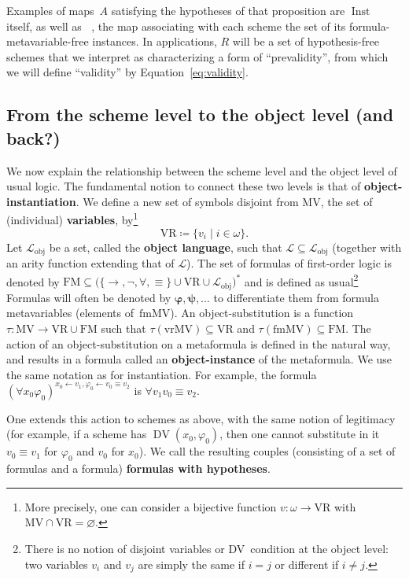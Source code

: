 \documentclass[11pt]{article}
\newcommand*{\define}[1]{\textbf{#1}}%
\renewcommand*{\phi}{\varphi}
\newcommand*{\calL}{\mathcal{L}}
\newcommand*{\VR}{\mathrm{VR}}
\newcommand*{\vrMV}{\mathrm{vrMV}}
\newcommand*{\fmMV}{\mathrm{fmMV}}
\newcommand*{\MV}{\mathrm{MV}}
\newcommand*{\FM}{\mathrm{FM}}
\DeclareMathOperator{\DV}{DV}
\DeclareMathOperator{\Inst}{Inst}
\DeclareMathOperator{\InstfmMVfree}{{\Inst_{\fmMV\text{-}\mathrm{free}}}}
\theoremstyle{plain}
\theoremstyle{definition}
\theoremstyle{remark}
\begin{document}
Examples of maps~$A$ satisfying the hypotheses of that proposition are $\Inst$ itself, as well
as $\InstfmMVfree$, the map associating with each scheme the set of its formula-metavariable-free
instances.
In applications, $R$ will be a set of hypothesis-free schemes that we interpret as characterizing
a form of ``prevalidity'', from which we will define ``validity'' by Equation~\eqref{eq:validity}.




\subsection{From the scheme level to the object level (and back?)}

We now explain the relationship between the scheme level and the object level of usual logic. The
fundamental notion to connect these two levels is that of \define{object-instantiation}. We 
define a new set of symbols disjoint from $\MV$, the set of (individual) \define{variables},
by\footnote{
More precisely, one can consider a bijective function $v \colon \omega \to \VR$ with
$\MV \cap \VR = \varnothing$.}
\begin{equation}
\VR \coloneqq \{v_i \mid i \in \omega \}.
\end{equation}
Let $\calL_\text{obj}$ be a set, called the \define{object language}, such that
$\calL \subseteq \calL_\text{obj}$ (together with an arity function extending that of $\calL$).
The set of formulas of first-order logic is denoted by
$\FM \subseteq \bigl( \{ \to , \neg, \forall, \equiv \} \cup \VR \cup \calL_\text{obj} \bigr)^*$
and is defined as usual\footnote{
There is no notion of disjoint variables or DV~condition at the object level: two variables $v_i$
and $v_j$ are simply the same if $i = j$ or different if $i\neq j$.}
Formulas will often be denoted by $\bm\phi, \bm\psi, \dots$ to differentiate them from formula
metavariables (elements of~$\fmMV$).
An object-substitution is a function $\tau \colon \MV \to \VR \cup \FM$ such that
$\tau(\vrMV) \subseteq \VR$ and $\tau(\fmMV) \subseteq \FM$.
The action of an object-substitution on a metaformula is defined in the natural way, and results in
a formula called an \define{object-instance} of the metaformula.
We use the same notation as for instantiation.
For example, the formula $(\forall x_0 \phi_0)^{x_0 \leftarrow v_1, \phi_0 \leftarrow v_0\equiv v_2}$
is $\forall v_1 v_0\equiv v_2$.

One extends this action to schemes as above, with the same notion of legitimacy (for example, if a
scheme has $\DV(x_0, \phi_0)$, then one cannot substitute in it $v_0 \equiv v_1$ for $\phi_0$
and $v_0$ for $x_0$). We call the resulting couples (consisting of a set of formulas and a formula)
\define{formulas with hypotheses}.
\end{document}
